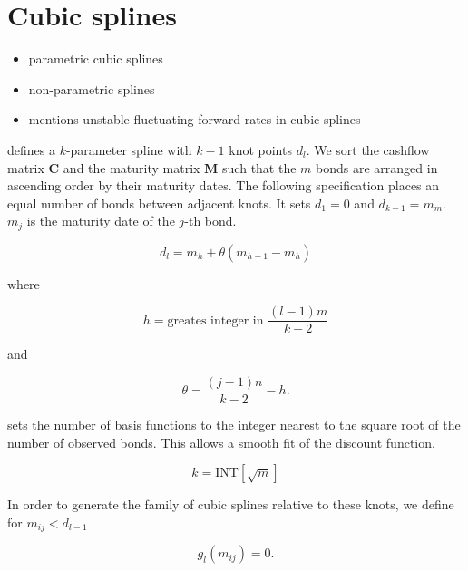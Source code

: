 \section{Cubic splines}
\label{sec:cubic-splines}

\begin{itemize}
\item parametric cubic splines \cite{McCulloch1971, McCulloch1975}
\item non-parametric splines \cite{Adams1994,Fisher1995, Waggoner1997, Tanggaard1997, Shea1985}
\item \cite{Shea1985} mentions unstable fluctuating forward rates in \cite{McCulloch1975} cubic splines

\end{itemize}

\cite{McCulloch1975} defines a $k$-parameter spline with $k-1$ knot points $d_l$. We sort the cashflow matrix $\bm{C}$ and the maturity matrix $\bm{M}$ such that the $m$ bonds are arranged in ascending order by their maturity dates. The following specification places an equal number of bonds between adjacent knots. It sets $d_1=0$ and $d_{k-1}=m_m$. $m_j$ is the maturity date of the $j$-th bond.


\begin{equation}
  \label{eq:A.1a}
  d_l = m_h+\theta(m_{h+1}-m_h)
\end{equation}

where

\begin{equation}
 \label{eq:A.1b}
  h = \mbox{greates integer in }\frac{(l-1)m}{k-2}
\end{equation}

and

\begin{equation}
  \label{eq:A.1c}
  \theta = \frac{(j-1)n}{k-2}-h.
\end{equation}

\cite{McCulloch1971} sets the  number of basis functions to the integer nearest to the square root of the number of observed bonds. This allows a smooth fit of the discount function.

\begin{equation}
  \label{eq:nofknots}
  k = \mbox{INT}\left[\sqrt{m}\right]
\end{equation}


In order to generate the family of cubic splines relative to these knots, we define for $m_{ij}<d_{l-1}$

\begin{equation}
  \label{eq:A.2}
  g_l(m_{ij})=0.
\end{equation}


